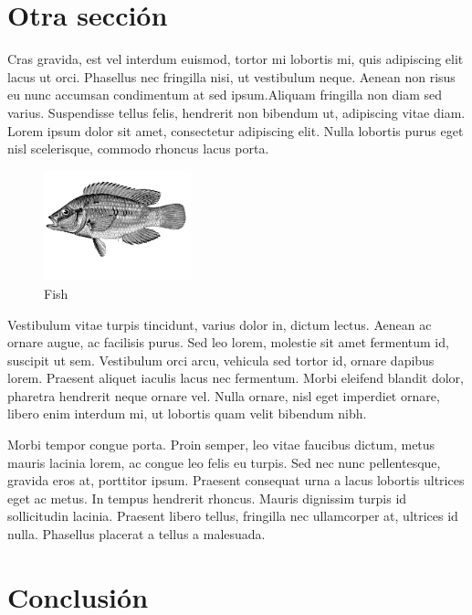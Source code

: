 \documentclass[a4paper, 11pt]{article} %
\begin{document}
\section*{Otra sección}

Cras gravida, est vel interdum euismod, tortor mi lobortis mi, quis adipiscing elit lacus ut orci. Phasellus nec fringilla nisi, ut vestibulum neque. Aenean non risus eu nunc accumsan condimentum at sed ipsum.Aliquam fringilla non diam sed varius. Suspendisse tellus felis, hendrerit non bibendum ut, adipiscing vitae diam. Lorem ipsum dolor sit amet, consectetur adipiscing elit. Nulla lobortis purus eget nisl scelerisque, commodo rhoncus lacus porta.

\begin{figure} %
\begin{center}
\includegraphics[width=0.38\textwidth]{fish.png}
\end{center}
\caption{Fish}
\end{figure}

 Vestibulum vitae turpis tincidunt, varius dolor in, dictum lectus. Aenean ac ornare augue, ac facilisis purus. Sed leo lorem, molestie sit amet fermentum id, suscipit ut sem. Vestibulum orci arcu, vehicula sed tortor id, ornare dapibus lorem. Praesent aliquet iaculis lacus nec fermentum. Morbi eleifend blandit dolor, pharetra hendrerit neque ornare vel. Nulla ornare, nisl eget imperdiet ornare, libero enim interdum mi, ut lobortis quam velit bibendum nibh.

Morbi tempor congue porta. Proin semper, leo vitae faucibus dictum, metus mauris lacinia lorem, ac congue leo felis eu turpis. Sed nec nunc pellentesque, gravida eros at, porttitor ipsum. Praesent consequat urna a lacus lobortis ultrices eget ac metus. In tempus hendrerit rhoncus. Mauris dignissim turpis id sollicitudin lacinia. Praesent libero tellus, fringilla nec ullamcorper at, ultrices id nulla. Phasellus placerat a tellus a malesuada.


\section*{Conclusión}
\end{document}
